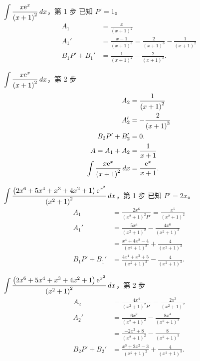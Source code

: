 \documentclass{beamer}
\newcommand{\e}{\textup e}
\theoremstyle{remark}
\begin{document}
\begin{CJK}{UTF8}{bsmi}
\begin{frame}{$\displaystyle \int \frac{x \e^x}{\left( x+1 \right)^2}\,dx$，第 1 步}
  已知 $P' = 1$。
  \begin{align*}
    A_1  &= \frac{x}{\left( x+1 \right)^2}\\
    A_1' &= \frac{x-1}{\left( x+1 \right)^3} = \frac{2}{\left( x+1 \right)^3} - \frac{1}{\left( x+1 \right)^2}\\
    B_1 P' + B_1' &= \frac{1}{\left( x+1 \right)^2} - \frac{2}{\left( x+1 \right)^3}.
  \end{align*}
\end{frame}

\begin{frame}{$\displaystyle \int \frac{x \e^x}{\left( x+1 \right)^2}\,dx$，第 2 步}
  \begin{align*}
    A_2  &= \frac{1}{\left( x+1 \right)^2}\\
    A_2' &= -\frac{2}{\left( x+1 \right)^3}\\
    B_2 P' + B_2' &= 0.\\
    A = A_1 + A_2 &= \frac{1}{x+1}\\
    \int \frac{x \e^x}{\left( x+1 \right)^2}\,dx &= \frac{\e^x}{x+1}.
  \end{align*}
\end{frame}

\begin{frame}{$\displaystyle \int \frac{\left( 2x^6 + 5x^4 + x^3 + 4x^2 + 1 \right) \e^{x^2}}{\left( x^2 + 1 \right)^2}
    \,dx$，第 1 步}
  已知 $P' = 2x$。
  \begin{align*}
    A_1  &= \frac{2x^6}{\left( x^2 + 1 \right)^2 P'} = \frac{x^5}{\left( x^2 + 1 \right)^2}\\
    A_1' &= \frac{5x^4}{\left( x^2 + 1 \right)^2} - \frac{4x^6}{\left( x^2 + 1 \right)^3}\\
         &= \frac{x^4 + 4x^2 - 4}{\left( x^2 + 1 \right)^2} + \frac{4}{\left( x^2 + 1 \right)^3}\\
    B_1 P' + B_1' &= \frac{4x^4 + x^3 + 5}{\left( x^2 + 1 \right)^2} - \frac{4}{\left( x^2 + 1 \right)^3}.
  \end{align*}
\end{frame}

\begin{frame}{$\displaystyle \int \frac{\left( 2x^6 + 5x^4 + x^3 + 4x^2 + 1 \right) \e^{x^2}}{\left( x^2 + 1 \right)^2}
    \,dx$，第 2 步}
  \begin{align*}
    A_2  &= \frac{4x^4}{\left( x^2 + 1 \right)^2 P'} = \frac{2x^3}{\left( x^2 + 1 \right)^2}\\
    A_2' &= \frac{6x^2}{\left( x^2 + 1 \right)^2} - \frac{8x^4}{\left( x^2 + 1 \right)^3}\\
         &= \frac{-2x^2 + 8}{\left( x^2 + 1 \right)^2} - \frac{8}{\left( x^2 + 1 \right)^3}\\
    B_2 P' + B_2' &= \frac{x^3 + 2x^2 - 3}{\left( x^2 + 1 \right)^2} + \frac{4}{\left( x^2 + 1 \right)^3}.
  \end{align*}
\end{frame}


\end{CJK}
\end{document}
